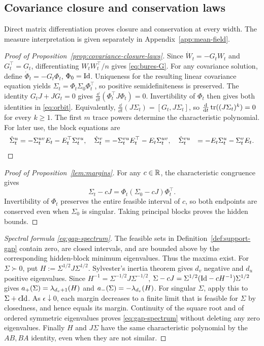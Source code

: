 \subsection{Covariance closure and conservation laws}
\label{app:covariance-laws}
Direct matrix differentiation proves closure and conservation at
every width. The measure interpretation is given separately in
Appendix~\ref{app:mean-field}.

\begin{proof}[Proof of Proposition~\ref{prop:covariance-closure-laws}]
Since $\dot W_t=-G_tW_t$ and $G_t^\top=G_t$,
differentiating $W_tW_t^\top/n$ gives \eqref{eq:bures-G}.
For any covariance solution, define
$\dot\Phi_t=-G_t\Phi_t$, $\Phi_0=\mathrm{Id}$. Uniqueness for the resulting
linear covariance equation yields
$\Sigma_t=\Phi_t\Sigma_0\Phi_t^\top$, so positive semidefiniteness
is preserved. The identity $G_tJ+JG_t=0$ gives
$\frac{\dd}{\dd t}(\Phi_t^\top J\Phi_t)=0$.
Invertibility of $\Phi_t$ then gives both identities in
\eqref{eq:orbit}. Equivalently,
$\frac{\dd}{\dd t}(J\Sigma_t)=[G_t,J\Sigma_t]$, so
$\frac{\mathrm{d}}{\mathrm{d} t}\operatorname{tr}((J\Sigma_t)^k)=0$ for every $k\ge1$.
The first $m$ trace powers determine the characteristic polynomial.
For later use, the block equations are
\begin{equation}\label{eq:block-flow-general}
 \begin{aligned}
 \dot{\Sigma}^u_t&=-\Sigma^{uv}_tE_t-E_t^\top\Sigma^{vu}_t,\quad
 \dot{\Sigma}^v_t=-\Sigma^{vu}_tE_t^\top-E_t\Sigma^{uv}_t,\quad
 \dot{\Sigma}^{vu}_t&=-E_t\Sigma^u_t-\Sigma^v_tE_t.
 \end{aligned}
\end{equation}
\end{proof}

\begin{proof}[Proof of Proposition~\ref{lem:margins}]
For any $c\in\mathbb{R}$, the characteristic congruence gives
\[
 \Sigma_t-cJ=\Phi_t(\Sigma_0-cJ)\Phi_t^\top.
\]
Invertibility of $\Phi_t$ preserves the entire feasible interval of $c$,
so both endpoints are conserved even when $\Sigma_0$ is singular.
Taking principal blocks proves the hidden bounds.
\end{proof}

\begin{proof}[Spectral formula \eqref{eq:gap-spectrum}]
The feasible sets in Definition~\ref{def:support-gap} contain zero, are
closed intervals, and are bounded above by the corresponding hidden-block
minimum eigenvalues. Thus the maxima exist.
For $\Sigma\succ0$, put $H:=\Sigma^{1/2}J\Sigma^{1/2}$.
Sylvester's inertia theorem gives $d_v$ negative and $d_u$ positive
eigenvalues. Since $H^{-1}=\Sigma^{-1/2}J\Sigma^{-1/2}$,
$\Sigma-cJ=\Sigma^{1/2}(\mathrm{Id}-cH^{-1})\Sigma^{1/2}$ gives
$a_+(\Sigma)=\lambda_{d_v+1}(H)$ and
$a_-(\Sigma)=-\lambda_{d_v}(H)$.
For singular $\Sigma$, apply this to $\Sigma+\epsilon\mathrm{Id}$.
As $\epsilon\downarrow0$, each margin decreases to a finite limit that
is feasible for $\Sigma$ by closedness, and hence equals its margin.
Continuity of the square root and of ordered symmetric eigenvalues
proves \eqref{eq:gap-spectrum} without deleting any zero eigenvalues.
Finally $H$ and $J\Sigma$ have the same characteristic polynomial by
the $AB,BA$ identity, even when they are not similar.
\end{proof}

